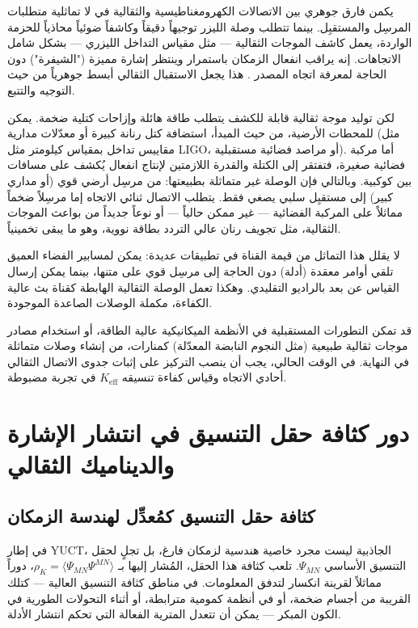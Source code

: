 \documentclass[11pt,a4paper]{article}
\begin{document}
	يكمن فارق جوهري بين الاتصالات الكهرومغناطيسية والثقالية في لا تماثلية متطلبات المرسِل والمستقبِل. بينما تتطلب وصلة الليزر توجيهاً دقيقاً وكاشفاً ضوئياً محاذياً للحزمة الواردة، يعمل كاشف الموجات الثقالية — مثل مقياس التداخل الليزري — بشكل شامل الاتجاهات. إنه يراقب انفعال الزمكان باستمرار وينتظر إشارة مميزة ("الشيفرة") دون الحاجة لمعرفة اتجاه المصدر \cite{LIGO}. هذا يجعل الاستقبال الثقالي أبسط جوهرياً من حيث التوجيه والتتبع.
	
	لكن توليد موجة ثقالية قابلة للكشف يتطلب طاقة هائلة وإزاحات كتلية ضخمة. يمكن للمحطات الأرضية، من حيث المبدأ، استضافة كتل رنانة كبيرة أو معدّلات مدارية (مثل مقاييس تداخل بمقياس كيلومتر مثل LIGO، أو مراصد فضائية مستقبلية). أما مركبة فضائية صغيرة، فتفتقر إلى الكتلة والقدرة اللازمتين لإنتاج انفعال يُكشف على مسافات بين كوكبية. وبالتالي فإن الوصلة غير متماثلة بطبيعتها: من مرسِل أرضي قوي (أو مداري كبير) إلى مستقبِل سلبي يصغي فقط. يتطلب الاتصال ثنائي الاتجاه إما مرسِلاً ضخماً مماثلاً على المركبة الفضائية — غير ممكن حالياً — أو نوعاً جديداً من بواعث الموجات الثقالية، مثل تجويف رنان عالي التردد بطاقة نووية، وهو ما يبقى تخمينياً.
	
	لا يقلل هذا التماثل من قيمة القناة في تطبيقات عديدة: يمكن لمسابير الفضاء العميق تلقي أوامر معقدة (أدلة) دون الحاجة إلى مرسِل قوي على متنها، بينما يمكن إرسال القياس عن بعد بالراديو التقليدي. وهكذا تعمل الوصلة الثقالية الهابطة كقناة بث عالية الكفاءة، مكملة الوصلات الصاعدة الموجودة.
	
	قد تمكن التطورات المستقبلية في الأنظمة الميكانيكية عالية الطاقة، أو استخدام مصادر موجات ثقالية طبيعية (مثل النجوم النابضة المعدّلة) كمنارات، من إنشاء وصلات متماثلة في النهاية. في الوقت الحالي، يجب أن ينصب التركيز على إثبات جدوى الاتصال الثقالي أحادي الاتجاه وقياس كفاءة تنسيقه \(K_{\mathrm{eff}}\) في تجربة مضبوطة.
	
	\section{دور كثافة حقل التنسيق في انتشار الإشارة والديناميك الثقالي}
	\label{sec:coord-density}
	
	\subsection{كثافة حقل التنسيق كمُعدِّل لهندسة الزمكان}
	
	في إطار YUCT، الجاذبية ليست مجرد خاصية هندسية لزمكان فارغ، بل تجلٍ لحقل التنسيق الأساسي \(\Psi_{MN}\). تلعب كثافة هذا الحقل، المُشار إليها بـ \(\rho_K = \langle \Psi_{MN}\Psi^{MN} \rangle\)، دوراً مماثلاً لقرينة انكسار لتدفق المعلومات. في مناطق كثافة التنسيق العالية — كتلك القريبة من أجسام ضخمة، أو في أنظمة كمومية مترابطة، أو أثناء التحولات الطورية في الكون المبكر — يمكن أن تتعدل المترية الفعالة التي تحكم انتشار الأدلة.
	
\end{document}
